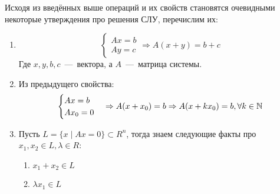 \begin{rem}
    Исходя из введённых выше операций и их свойств становятся очевидными некоторые утверждения
    про решения СЛУ, перечислим их:
    \begin{enumerate}
        \item
            $$
            \begin{cases}
                Ax = b\\
                Ay = c
            \end{cases}\Rightarrow
            A(x+y) = b+c
            $$
            Где $x,y,b,c$~---~вектора, а $A$~---~матрица системы.
        \item
            Из предыдущего свойства:
            $$
            \begin{cases}
                Ax=b\\
                Ax_0=0
            \end{cases}\Rightarrow
            A(x+x_0)=b\Rightarrow A(x + kx_0) = b, \forall k\in \mathbb{N}
            $$
        \item
            Пусть $L = \{x\mid Ax=0\}\subset R^n$, тогда знаем следующие факты про 
            $x_1, x_2\in L, \lambda \in R$:
            \begin{enumerate}
                \item $x_1 + x_2 \in L$
                \item $\lambda x_1 \in L$
            \end{enumerate}
    \end{enumerate}
\end{rem}
